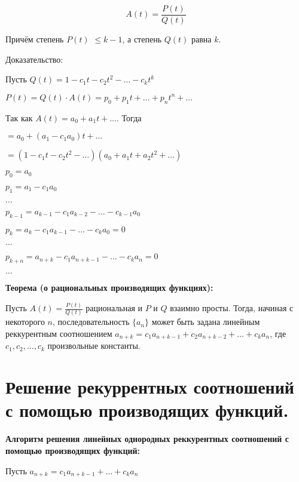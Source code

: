     \[
        A(t) = \frac{P(t)}{Q(t)}  
    \]

    Причём степень $P(t)$ $\leq k - 1$, а степень $Q(t)$ равна $k$.
    \bigskip

    Доказательство:
    \bigskip

    Пусть $Q(t) = 1 - c_1t - c_2t^2 - \dots - c_kt^k$
    \smallskip

    $P(t) = Q(t) \cdot A(t) = p_0 + p_1t + \dots + p_nt^n + \dots$
    \smallskip

    Так как $A(t) = a_0 + a_1 t + \dots$. Тогда
    \smallskip

    $= a_0 + (a_1 - c_1a_0)t + \dots$
    \smallskip

    $ = (1 - c_1 t - c_2 t^2 - \dots)(a_0 + a_1 t + a_2 t^2 + \dots)$
    \smallskip

    $p_0 = a_0$
    \smallskip

    $p_1 = a_1 - c_1 a_0$
    \smallskip

    $\dots$
    \smallskip

    $p_{k - 1} = a_{k - 1} - c_1 a_{k - 2} - \dots - c_{k - 1}a_0$
    \smallskip

    $p_k = a_k - c_1 a_{k - 1} - \dots - c_k a_0 = 0$
    \smallskip

    $\dots$
    \smallskip

    $p_{k + n} = a_{n + k} - c_1 a_{n + k - 1} - \dots - c_k a_n = 0$
    \smallskip

    $\dots$
    \bigskip

\textbf{Теорема (о рациональных производящих функциях):}
    \smallskip
    
    Пусть $A(t) = \frac{P(t)}{Q(t)}$ рациональная и $P$ и $Q$ взаимно просты.
    Тогда, начиная с некоторого $n$, последовательность $\{a_n\}$ может
    быть задана линейным реккурентным соотношением $a_{n + k} =
    c_1 a_{n + k - 1} + c_2 a_{n + k - 2} + \dots + c_k a_n$,
    где $c_1, c_2, \dots, c_k$ произвольные константы.

\section{Решение рекуррентных соотношений с помощью производящих функций.}    

\textbf{Алгоритм решения линейных однородных реккурентных соотношений 
с помощью производящих функций:}
    \smallskip

    Пусть $a_{n + k} = c_1 a_{n + k - 1} + \dots + c_k a_n$
    
